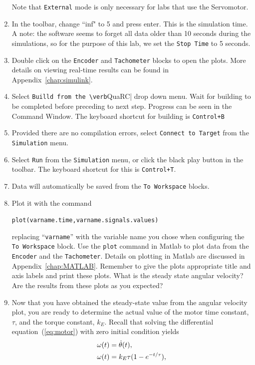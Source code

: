 \begin{enumerate}
Note that \verb|External| mode is only necessary for labs that use the Servomotor. 
\item In the toolbar, change ``inf" to 5 and press enter. This is the simulation time. A note: the software seems to forget all data older than 10 seconds during the simulations, so for the purpose of this lab, we set the \verb|Stop Time| to 5 seconds.
\item Double click on the \verb|Encoder| and \verb|Tachometer| blocks to open
the plots.  More details on viewing real-time results can be found in
Appendix~\ref{chap:simulink}\@.
\item Select \verb|Builld from the \verb|QuaRC| drop down menu.  Wait for
building to be completed before preceding to next step. Progress can be seen
in the Command Window. The keyboard shortcut for building is \verb|Control+B|
\item Provided there are no compilation errors, select
\verb|Connect to Target| from the \verb|Simulation| menu.
\item Select \verb|Run| from the \verb|Simulation| menu, or click
the black play button in the toolbar. The keyboard shortcut for this is \verb|Control+T|.
\item Data will automatically be saved from the \verb|To Workspace| blocks.
\item Plot it with the command
\begin{center}
\verb|plot(varname.time,varname.signals.values)|
\end{center}
replacing ``\verb|varname|'' with the variable name you chose when
configuring the \verb|To Workspace| block.  Use the \verb|plot| command in
\textsf{Matlab} to plot data from the \verb|Encoder| and the
\verb|Tachometer|.  Details on plotting in \textsf{Matlab} are discussed in
Appendix~\ref{chap:MATLAB}\@.  Remember to give the plots appropriate title
and axis labels and print these plots. What is the steady state angular
velocity?  Are the results from these plots as you expected?
\item Now that you have obtained the steady-state value from the angular
velocity plot, you are ready to determine the actual value of the motor time
constant, $\tau$, and the torque constant, $k_{E}$\@.  Recall that solving
the differential equation~(\ref{eq:motor}) with zero initial condition yields
\begin{align}\notag
\omega(t)=&\;\dot\theta(t),\\\label{eq:motorSoln}
\omega(t)=&\;k_{E}\tau (1-e^{-t/\tau}),
\end{align}

\end{enumerate}
